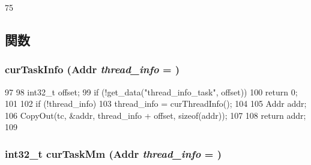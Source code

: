 \begin{DoxyCode}
75     {}
\end{DoxyCode}


\subsection{関数}
\hypertarget{classLinux_1_1ThreadInfo_a1a8fccfe3891a5949b7acbf68d210165}{
\subsubsection[{curTaskInfo}]{ curTaskInfo ({\bf Addr} {\em thread\_\-info} = {})}}
\label{classLinux_1_1ThreadInfo_a1a8fccfe3891a5949b7acbf68d210165}



\begin{DoxyCode}
97     {
98         int32_t offset;
99         if (!get_data("thread_info_task", offset))
100             return 0;
101 
102         if (!thread_info)
103             thread_info = curThreadInfo();
104 
105         Addr addr;
106         CopyOut(tc, &addr, thread_info + offset, sizeof(addr));
107 
108         return addr;
109     }
\end{DoxyCode}
\hypertarget{classLinux_1_1ThreadInfo_a9e35eef467b5e80427937e62772c91da}{
\subsubsection[{curTaskMm}]{\setlength{\rightskip}{0pt plus 5cm}int32\_\-t curTaskMm ({\bf Addr} {\em thread\_\-info} = {})}}
\label{classLinux_1_1ThreadInfo_a9e35eef467b5e80427937e62772c91da}



